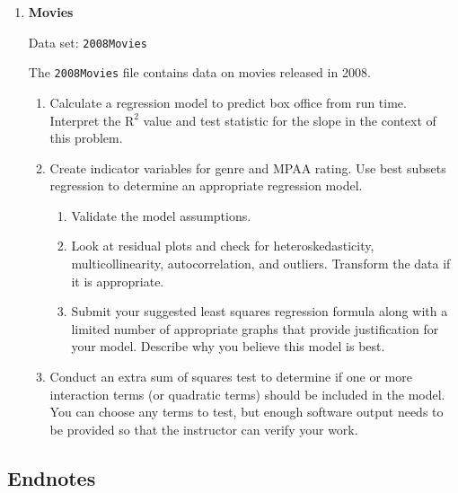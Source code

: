 \documentclass[
]{book}
\begin{document}
\begin{enumerate}
  \begin{enumerate}
    \item Use the \texttt{Caucuses} data to test the hypothesis that education level is correlated to a higher percentage of votes for Senator Obama.
      \item Use the \texttt{Caucuses} data to create a multivariate model that “best” predicts the percentage of delegates Senator Obama would win.
    \end{enumerate}

  \item \textbf{Movies}

Data set: \texttt{2008Movies}

The \texttt{2008Movies} file contains data on movies released in 2008.

  \begin{enumerate}
    \item Calculate a regression model to predict box office from run time. Interpret the $\mathrm{R}^2$ value and test statistic for the slope in the context of this problem.
      \item Create indicator variables for genre and MPAA rating. Use best subsets regression to determine an appropriate regression model.
        \begin{enumerate}
          \item Validate the model assumptions.
          \item Look at residual plots and check for heteroskedasticity, multicollinearity, autocorrelation, and outliers. Transform the data if it is appropriate.
          \item Submit your suggested least squares regression formula along with a limited number of appropriate graphs that provide justification for your model. Describe why you believe this model is best.
        \end{enumerate}
      \item Conduct an extra sum of squares test to determine if one or more interaction terms (or quadratic terms) should be included in the model. You can choose any terms to test, but enough software output needs to be provided so that the instructor can verify your work.
    \end{enumerate}

\end{enumerate}

\hypertarget{endnotes-1}{%
\subsection*{Endnotes}\label{endnotes-1}}
\end{document}
